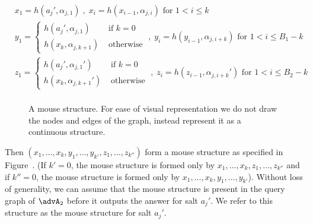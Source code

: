 \begin{align*} 
  &x_1= h(a_j',\alpha_{j,1})\;,\; x_i=h(x_{i-1},\alpha_{j,i}) \text{  for $1< i\leq k$}\\
  &y_1= \begin{cases}
    h(a_j',\alpha_{j,1}) &\text{ if }k=0\\
    h(x_k,\alpha_{j,k+1})&\text{ otherwise}
  \end{cases}\;,\;
  y_i=h(y_{i-1},\alpha_{j,i+k}) \text{    for $1< i\leq B_1-k$}\\
  &z_1= \begin{cases}
    h(a_j',\alpha_{j,1}')&\text{ if }k=0\\
    h(x_k,\alpha_{j,k+1}')&\text{ otherwise}
  \end{cases}\;,\;
  z_i=h(z_{i-1},\alpha_{j,i+k}') \text{    for $1< i\leq B_2-k$}\\
\end{align*}
\begin{figure}
  \centering
  \caption{A mouse structure. For ease of visual representation we do not draw the nodes and edges of the graph, instead represent it as a continuous structure.} \label{fig:mouse-structure}
  \end{figure}
Then $(x_1,\ldots,x_k,y_1,\ldots, y_{k'},z_1,\ldots,z_{k''})$ form a mouse structure as specified in Figure~. (If $k'=0$, the mouse structure is formed only by $x_1,\ldots,x_k,z_1,\ldots,z_{k''}$ and if $k''=0$, the mouse structure is formed only by $x_1,\ldots,x_k,y_1,\ldots,y_{k'}$).
Without loss of generality, we can assume that the mouse structure is present in the query graph of $\advA_2$ before it outputs the answer for salt $a_j'$.
We refer to this structure as the mouse structure for salt $a_j'$.

